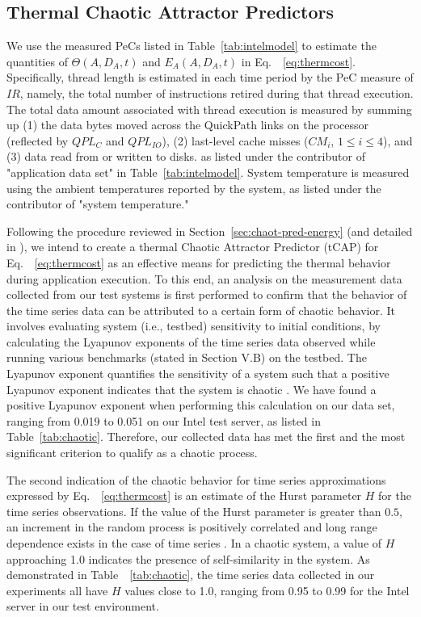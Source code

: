 \documentclass[times, 10pt,twocolumn]{IEEEtran}
\newcommand{\equationname}{Eq.\ }
\newcommand{\equationnames}{Eq.\ }
\begin{document}
\subsection{Thermal Chaotic Attractor Predictors}
\label{sec:therm-chaot-attr} 
We use the measured PeCs listed in Table~\ref{tab:intelmodel} to
estimate the quantities of $\Theta(A, D_{A}, t)$ and $E_{A}(A, D_{A},
t)$ in \equationname~\eqref{eq:thermcost}.  Specifically, thread length
is estimated in each time period by the PeC measure of $IR$, namely, the
total number of instructions retired during that thread execution.  The
total data amount associated with thread execution is measured by
summing up (1) the data bytes moved across the QuickPath links on the
processor (reflected by $QPL_{C}$ and $QPL_{IO}$), (2) last-level cache
misses ($CM_{i}$, $1\leq i \leq 4$), and (3) data read from or written
to disks.  as listed under the contributor of "application data set" in
Table~\ref{tab:intelmodel}.  System temperature is measured using the
ambient temperatures reported by the system, as listed under the
contributor of "system temperature."

Following the procedure reviewed in Section~\ref{sec:chaot-pred-energy}
(and detailed in \cite{Lewis2010}), we intend to create a thermal
Chaotic Attractor Predictor (tCAP) for
\equationnames~\eqref{eq:thermcost} as an effective means for predicting
the thermal behavior during application execution.  To this end, an
analysis on the measurement data collected from our test systems is
first performed to confirm that the behavior of the time series data can
be attributed to a certain form of chaotic behavior.  It involves
evaluating system (i.e., testbed) sensitivity to initial conditions, by
calculating the Lyapunov exponents of the time series data observed
while running various benchmarks (stated in Section V.B) on the testbed.
The Lyapunov exponent quantifies the sensitivity of a system such that a
positive Lyapunov exponent indicates that the system is chaotic
\cite{Sprott2003}.  We have found a positive Lyapunov exponent when
performing this calculation on our data set, ranging from 0.019 to 0.051
on our Intel test server, as listed in Table~\ref{tab:chaotic}.
Therefore, our collected data has met the first and the most significant
criterion to qualify as a chaotic process.

The second indication of the chaotic behavior for time series
approximations expressed by \equationnames~\eqref{eq:thermcost} is an
estimate of the Hurst parameter $H$ for the time series observations. If
the value of the Hurst parameter is greater than $0.5$, an increment in
the random process is positively correlated and long range dependence
exists in the case of time series \cite{Sprott2003}.  In a chaotic
system, a value of $H$ approaching 1.0 indicates the presence of
self-similarity in the system.  As demonstrated in
Table~~\ref{tab:chaotic}, the time series data collected in our
experiments all have $H$ values close to 1.0, ranging from 0.95 to 0.99
for the Intel server in our test environment.
\end{document}
